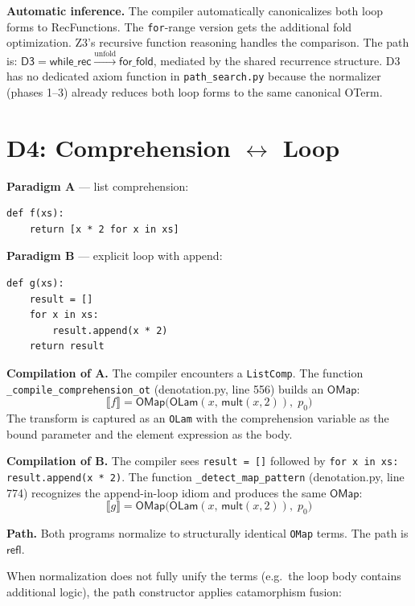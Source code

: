\documentclass[11pt,a4paper]{report}
\theoremstyle{definition}
\theoremstyle{plain}
\newcommand{\den}[1]{\llbracket #1 \rrbracket}
\begin{document}
\textbf{Automatic inference.}
The compiler automatically canonicalizes both loop forms to
RecFunctions.  The \texttt{for}-range version gets the additional
fold optimization.  Z3's recursive function reasoning handles the
comparison.  The path is:
$\mathsf{D3} = \mathsf{while\_rec} \xrightarrow{\text{unfold}} 
\mathsf{for\_fold}$, mediated by the shared recurrence structure.
D3 has no dedicated axiom function in \texttt{path\_search.py}
because the normalizer (phases 1--3) already reduces both loop
forms to the same canonical OTerm.


\section{D4: Comprehension $\leftrightarrow$ Loop}
\label{sec:d4}

\textbf{Paradigm A} --- list comprehension:
\begin{lstlisting}
def f(xs):
    return [x * 2 for x in xs]
\end{lstlisting}

\textbf{Paradigm B} --- explicit loop with append:
\begin{lstlisting}
def g(xs):
    result = []
    for x in xs:
        result.append(x * 2)
    return result
\end{lstlisting}

\textbf{Compilation of A.}
The compiler encounters a \texttt{ListComp}.  The function
\texttt{\_compile\_comprehension\_ot} (denotation.py, line 556)
builds an $\mathsf{OMap}$:
\[
  \den{f} = \mathsf{OMap}\!\big(
    \mathsf{OLam}(x,\, \mathsf{mult}(x, 2)),\; p_0\big)
\]
The transform is captured as an \texttt{OLam} with the comprehension
variable as the bound parameter and the element expression as the
body.

\textbf{Compilation of B.}
The compiler sees \texttt{result = []} followed by
\texttt{for x in xs: result.append(x * 2)}.  The function
\texttt{\_detect\_map\_pattern} (denotation.py, line 774) recognizes
the append-in-loop idiom and produces the same $\mathsf{OMap}$:
\[
  \den{g} = \mathsf{OMap}\!\big(
    \mathsf{OLam}(x,\, \mathsf{mult}(x, 2)),\; p_0\big)
\]

\textbf{Path.}
Both programs normalize to structurally identical \texttt{OMap} terms.
The path is $\mathsf{refl}$.

When normalization does not fully unify the terms (e.g.\ the loop
body contains additional logic), the path constructor applies
catamorphism fusion:
\end{document}
